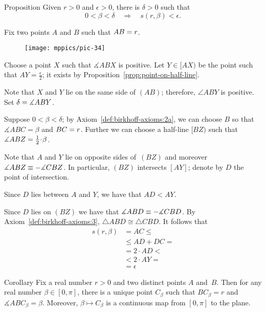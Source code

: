 \begin{thm}[\abs]{Proposition}\label{prop:f(r,a)}
Given $r>0$ and $\epsilon>0$, there is $\delta>0$ such that
\[0<\beta<\delta\quad\Longrightarrow\quad s(r,\beta)<\epsilon.\]

\end{thm}

Fix two points $A$ and $B$ such that $AB\z=r$.

{

\begin{wrapfigure}{o}{36mm}
\centering
\texttt{[image: mppics/pic-34]}
\end{wrapfigure}

Choose a point $X$ such that $\measuredangle ABX$ is positive.
Let $Y\in [AX)$ be the point such that $AY=\tfrac\epsilon2$;
it exists by Proposition~\ref{prop:point-on-half-line}.

Note that $X$ and $Y$ lie on the same side of $(AB)$;
therefore, $\angle ABY$ is positive. 
Set $\delta\z=\measuredangle ABY$.

Suppose $0<\beta<\delta$;
by Axiom~\ref{def:birkhoff-axioms:2a}, we can choose $B$ so that $\measuredangle ABC=\beta$ and $BC\z=r$.
Further we can choose a half-line $[BZ)$ such that $\measuredangle ABZ\z=\tfrac12\cdot \beta$.

Note that $A$ and $Y$ lie on opposite sides of~$(BZ)$ and moreover $\measuredangle ABZ\z\equiv -\measuredangle CBZ$.
In particular, $(BZ)$ intersects $[AY]$;
denote by $D$ the point of intersection.

Since $D$ lies between $A$ and $Y$, we have that $AD<AY$.

Since $D$ lies on $(BZ)$ we have that $\measuredangle ABD\z\equiv -\measuredangle CBD$.
By Axiom~\ref{def:birkhoff-axioms:3},
$\triangle ABD\cong \triangle CBD$.
It follows that
\begin{align*}
s(r,\beta)&=AC\le
\\
&\le AD+DC=
\\
&=2\cdot AD< 
\\
&< 2\cdot AY=
\\
&=\epsilon
\end{align*}
\qedsf

}

\begin{thm}[\abs]{Corollary}\label{cor:C-cont}
Fix a real number $r>0$ 
and two distinct points $A$ and~$B$.
Then for 
any real number $\beta\in [0,\pi]$,
there is a unique point $C_\beta$ such that $BC_\beta=r$
and $\measuredangle ABC_\beta=\beta$.
Moreover, $\beta\mapsto C_\beta$ 
is a continuous map from $[0,\pi]$ to the plane.
\end{thm}

